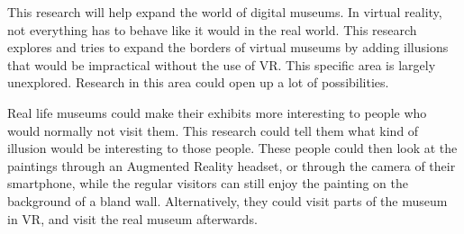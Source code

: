 \documentclass[a4paper]{article}
\begin{document}
This research will help expand the world of digital museums. In virtual reality, not everything has to behave like it would in the real world. This research explores and tries to expand the borders of virtual museums by adding illusions that would be impractical without the use of VR. This specific area is largely unexplored. Research in this area could open up a lot of possibilities.

Real life museums could make their exhibits more interesting to people who would normally not visit them. This research could tell them what kind of illusion would be interesting to those people. These people could then look at the paintings through an Augmented Reality headset, or through the camera of their smartphone, while the regular visitors can still enjoy the painting on the background of a bland wall. Alternatively, they could visit parts of the museum in VR, and visit the real museum afterwards.
\end{document}
